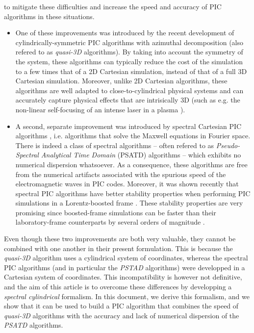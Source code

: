 \documentclass[a4paper]{article}   	%
\begin{document}
to mitigate these difficulties and increase the speed and
accuracy of PIC algorithms in these situations. 
\begin{itemize}
\item One of these improvements was introduced by the recent
  development of cylindrically-symmetric
PIC algorithms with azimuthal decomposition \citep{Lifschitz,Davidson} (also
refered to as \emph{quasi-3D} algorithms). By taking
into account the symmetry of the system, these algorithms can typically reduce
the cost of the simulation to a few times that of a 2D Cartesian simulation,
instead of that of a full 3D Cartesian simulation. Moreover, unlike 2D
Cartesian algorithms, these algorithms are well adapted to close-to-cylindrical
physical systems and can accurately capture physical effects that are intrisically
3D (such as e.g. the non-linear self-focusing of an intense laser in a
plasma \citep{EsareyRMP2009}).

\item A second, separate improvement was introduced by spectral
Cartesian PIC algorithms \citep{BunemanJCP1980,DawsonRMP1983},
i.e. algorithms that solve the Maxwell equations in Fourier
space. There is indeed a class of spectral algorithms -- often refered to
as \emph{Pseudo-Spectral Analytical Time Domain} (PSATD) algorithms 
\citep{Haber} -- which exhibits no numerical dispersion whatsoever. As a
consequence, these algorithms are free from the numerical artifacts
associated with the spurious speed of the electromagnetic waves in PIC
codes. Moreover, it was shown recently
\citep{XuJCP2013,YuJCP2014,YuCPC2015,
GodfreyIEEE2014,GodfreyJCP2014} 
that spectral PIC algorithms have better stability properties when 
performing PIC simulations in
a Lorentz-boosted frame \citep{VayPRL2007,MartinsNatPhys2010}. 
These stability properties are very
promising since boosted-frame simulations can be faster than 
their laboratory-frame counterparts by several orders of magnitude \citep{VayPRL2007}.
\end{itemize}

Even though these two improvements are both very valuable, they cannot be
combined with one another in their present
formulation. This is because the \emph{quasi-3D} algorithm uses a
cylindrical system of coordinates, whereas the spectral PIC algorithms
(and in particular the \emph{PSTAD} algorithms)
were developped in a Cartesian system of coordinates. This
incompatibility is however not definitive, and the aim of this article
is to overcome these differences by developping a \emph{spectral
  cylindrical} formalism. In this document, we derive this formalism,
and we show that it can be used to build a PIC algorithm that combines 
the speed of \emph{quasi-3D} algorithms with
the accuracy and lack of numerical dispersion of the \emph{PSATD} algorithms.
\end{document}

